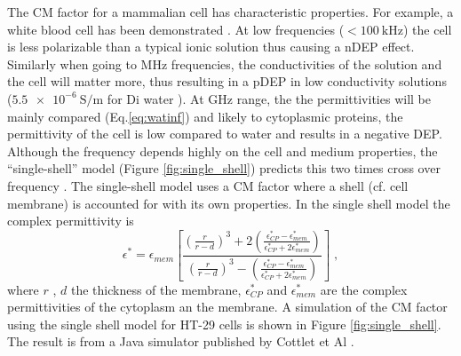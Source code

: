 \documentclass[final]{jyflluk}
\begin{document}
The CM factor for a mammalian cell has characteristic properties. For example, a white blood cell has been demonstrated \cite{voldman_electrical_2006}. At low frequencies ($<\SI{100}{\kilo \Hz}$) the cell is less polarizable than a typical ionic solution thus causing a nDEP effect. Similarly when going to MHz frequencies, the conductivities of the solution and the cell will matter more, thus resulting in a pDEP in low conductivity solutions ($\SI{5.5e-6}{ \siemens \per \metre}$ for Di water \cite{pashley2005gassed}). At GHz range, the the permittivities will be mainly compared (Eq.\ref{eq:watinf}) and likely to cytoplasmic proteins, the permittivity of the cell is low compared to water and results in a negative DEP.  Although the frequency depends highly on the cell and medium properties, the “single-shell” model (Figure \ref{fig:single_shell}) predicts this two times cross over frequency \cite{cetin_dielectrophoresis_2011,pethig_review_2010, voldman_electrical_2006, cottet_mydep_2019}. The single-shell model uses a CM factor where a shell (cf. cell membrane) is accounted for with its own properties. In the single shell model the complex permittivity is
%
\begin{equation}
   \label{eq:shellmodel}
   \epsilon^*=\epsilon_{mem} \left[ \frac{\left( \frac{r}{r-d}\right)^3 + 2\left(\frac{\epsilon_{CP}^* - \epsilon_{mem}^*}{\epsilon_{CP}^* + 2\epsilon_{mem}^*} \right)}{\left( \frac{r}{r-d}\right)^3 -\left(\frac{\epsilon_{CP}^* - \epsilon_{mem}^*}{\epsilon_{CP}^* + 2\epsilon_{mem}^*} \right)}        \right] \;,
\end{equation}
%
where $r$ , $d$ the thickness of the membrane, $\epsilon_{CP}^*$ and  $\epsilon_{mem}^*$ are the complex permittivities of the cytoplasm an the membrane. A simulation of the CM factor using the single shell model for HT-29 cells is shown in Figure \ref{fig:single_shell}. The result is from a Java  simulator published by Cottlet et Al \cite{cottet_mydep_2019}.
\end{document}
